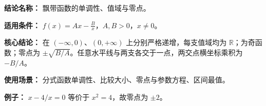 \textbf{结论名称：} 飘带函数的单调性、值域与零点。

\textbf{适用条件：} $f(x)=Ax-\frac Bx$，$A,B>0$，$x\ne0$。

\textbf{核心结论：} 在 $(-\infty,0)$、$(0,+\infty)$ 上分别严格递增，每支值域均为 $\mathbb R$；为奇函数；零点为 $\pm\sqrt{B/A}$。任意水平线与两支各交于一点，两交点横坐标乘积为 $-B/A$。

\textbf{使用场景：} 分式函数单调性、比较大小、零点与参数方程、区间最值。

\textbf{例子：} $x-4/x=0$ 等价于 $x^2=4$，故零点为 $\pm2$。
